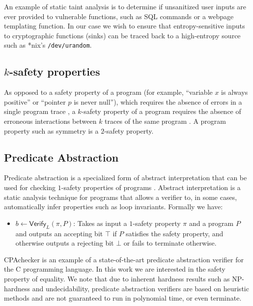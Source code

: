 \documentclass[letterpaper,twocolumn,10pt]{article}
\begin{document}
An example of static taint analysis is to determine if unsanitized user inputs are ever provided to vulnerable functions, such as SQL commands or
a webpage templating function. In our case we wish to ensure that entropy-sensitive inputs to cryptographic functions (sinks) can be
traced back to a high-entropy source such as *nix's \texttt{/dev/urandom}.

\subsection{$k$-safety properties}

As opposed to a safety property of a program (for example, ``variable $x$ is always positive'' or ``pointer $p$ is never null''), which requires
the absence of errors in a single program trace \cite{alpern1987recognizing}, a $k$-safety property of a program requires the absence of erroneous interactions between $k$
traces of the same program \cite{sousa2016cartesian}. A program property such as symmetry is a $2$-safety property.


\subsection{Predicate Abstraction}

Predicate abstraction is a specialized form of abstract interpretation that can be used for checking $1$-safety properties of programs
\cite{flanagan2002predicate}. Abstract interpretation is a static analysis technique for programs that allows a verifier to, in some cases, 
automatically infer properties such as loop invariants. Formally we have:

\begin{itemize}
    \item $b \gets \mathsf{Verify}_{L}(\pi, P)$: Takes as input a $1$-safety property $\pi$ and a program $P$ and outputs an accepting bit $\top$ if
    $P$ satisfies the safety property, and otherwise outputs a rejecting bit $\bot$ or fails to terminate otherwise.
\end{itemize}

CPAchecker \cite{beyer2011cpachecker} is an example of a state-of-the-art predicate abstraction verifier for the C programming language. In this work
we are interested in the safety property of equality. We note that due to inherent hardness results such as NP-hardness and undecidability, predicate
abstraction verifiers are based on heuristic methods and are not guaranteed to run in polynomial time, or even terminate.
\end{document}
